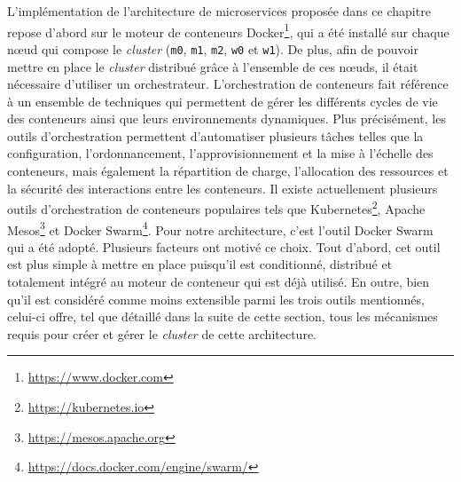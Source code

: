 L'implémentation de l'architecture de microservices proposée dans ce chapitre repose d'abord sur le moteur de conteneurs Docker\footnote{\url{https://www.docker.com}}, qui a été installé sur chaque n\oe{}ud qui compose le \textit{cluster} (\texttt{m0}, \texttt{m1}, \texttt{m2}, \texttt{w0} et \texttt{w1}). De plus, afin de pouvoir mettre en place le \textit{cluster} distribué grâce à l'ensemble de ces n\oe{}uds, il était nécessaire d'utiliser un orchestrateur. L'orchestration de conteneurs fait référence à un ensemble de techniques qui permettent de gérer les différents cycles de vie des conteneurs ainsi que leurs environnements dynamiques. Plus précisément, les outils d'orchestration permettent d'automatiser plusieurs tâches telles que la configuration, l'ordonnancement, l'approvisionnement et la mise à l'échelle des conteneurs, mais également la répartition de charge, l'allocation des ressources et la sécurité des interactions entre les conteneurs. Il existe actuellement plusieurs outils d'orchestration de conteneurs populaires tels que Kubernetes\footnote{\url{https://kubernetes.io}}, Apache Mesos\footnote{\url{https://mesos.apache.org}} et Docker Swarm\footnote{\url{https://docs.docker.com/engine/swarm/}}. Pour notre architecture, c'est l'outil Docker Swarm qui a été adopté. Plusieurs facteurs ont motivé ce choix. Tout d'abord, cet outil est plus simple à mettre en place puisqu'il est conditionné, distribué et totalement intégré au moteur de conteneur qui est déjà utilisé. En outre, bien qu'il est considéré comme moins extensible parmi les trois outils mentionnés, celui-ci offre, tel que détaillé dans la suite de cette section, tous les mécanismes requis pour créer et gérer le \textit{cluster} de cette architecture.

